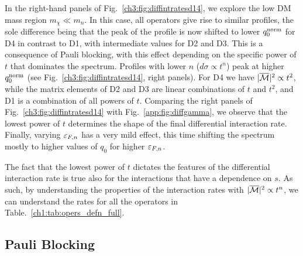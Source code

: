 In the right-hand panels of Fig.~\ref{ch3:fig:diffintratesd14}, we explore the low DM mass region $m_\chi\ll m_n$. 
In this case, all operators give rise to similar profiles, the sole difference being that the peak of the profile is now shifted to lower  $q_0^{\rm norm}$ for D4 in contrast to D1, with intermediate values for D2 and D3. This is a consequence of Pauli blocking, with this effect depending on the specific power of $t$ that dominates the spectrum. Profiles with lower $n$ ($d\sigma\propto t^n$) peak at higher $q_0^{\rm norm}$ (see Fig.~\ref{ch3:fig:diffintratesd14}, right panels). For D4 we have $|\overline{\mathcal M}|^2\propto t^2$, while the matrix elements of D2 and D3 are linear combinations of $t$ and $t^2$, and D1 is a combination of all powers of $t$. Comparing the right panels of Fig.~\ref{ch3:fig:diffintratesd14} with Fig.~\ref{app:fig:diffgamma}, we observe that the lowest power of $t$ determines the shape of the final differential interaction rate. Finally, varying $\varepsilon_{F,n}$ has a very mild effect, this time shifting the spectrum mostly to higher values of $q_0$ for higher $\varepsilon_{F,n}$.

The fact that the lowest power of $t$ dictates the features of the differential interaction rate is true also for the interactions that have a dependence on $s$. As such, by understanding the properties of the interaction rates with $|\overline{\mathcal M}|^2\propto t^n$, we can understand the rates for all the operators in Table.~\ref{ch1:tab:opers_defn_full}.


\subsection{Pauli Blocking}
\label{ch3:subsec:PB_cap}

